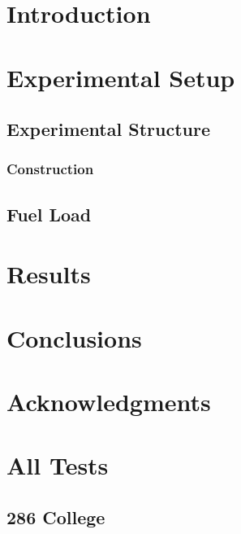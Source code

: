 \documentclass[12pt,oneside]{book}
\begin{document}
\mainmatter

\chapter{Introduction}
\label{chap:Introduction}

\chapter{Experimental Setup}
\label{chap:Experimental_Setup}

\section{Experimental Structure}
\label{sec:Experimental_Structure}

\subsection{Construction}
\label{sec:Construction}

\section{Fuel Load}

\chapter{Results}
\label{chap:Results}


\clearpage


\chapter{Conclusions}
\label{chap:Conclusions}

\chapter{Acknowledgments}
\label{chap:Acknowledgments}



\appendix

\chapter{All Tests}

\section{286 College}
\end{document}
